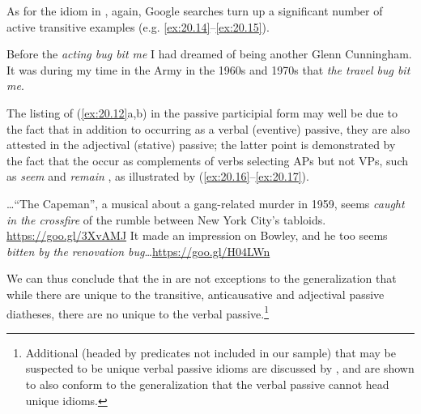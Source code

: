\documentclass[output=paper]{langsci/langscibook}
\begin{document}
As for the idiom in , again, Google searches turn up a
significant number of active transitive examples (e.g.
\ref{ex:20.14}--\ref{ex:20.15}).

\ea\label{ex:20.14}
    Before the \textit{acting bug bit me} I had dreamed of being another
    Glenn Cunningham.\hspace*{\fill} \parencite[66]{Halbrook2001}
\ex \label{ex:20.15}
    It was during my time in the Army in the 1960s and 1970s that \textit{the
    travel bug bit me}.\hspace*{\fill}\parencite[Introduction]{MacKrell2006}
\z

The listing of (\ref{ex:20.12}a,b) in the passive participial form may well
be due to the fact that in addition to occurring as a verbal (eventive)
passive, they are also attested in the adjectival (stative) passive; the latter
point is demonstrated by the fact that the  occur as complements of
verbs selecting APs but not VPs, such as \emph{seem} and \emph{remain}
\citep{Wasow1977}, as illustrated by (\ref{ex:20.16}--\ref{ex:20.17}).

\ea\label{ex:20.16}
    \dots \enquote{The Capeman}, a musical about a gang-related murder in 1959,
    seems \textit{caught in the crossfire} of the rumble between New York
    City's tabloids.\\\hspace*{\fill}\url{https://goo.gl/3XvAMJ}
\ex \label{ex:20.17}
    It made an impression on Bowley, and he too seems \textit{bitten by the
    renovation bug}\dots{}\hspace*{\fill}\url{https://goo.gl/H04LWn}
\z

We can thus conclude that the  in  are not exceptions to
the generalization that while there are  unique to the transitive,
anticausative and adjectival passive diatheses, there are no  unique to
the verbal passive.\footnote{ \textrm{Additional  (headed by predicates
not included in our sample) that may be suspected to be unique verbal passive
idioms are discussed by \citet{HorSil2019}, and are shown to also
conform to the generalization that the verbal passive cannot head unique
idioms.}}\tss{}
\end{document}
